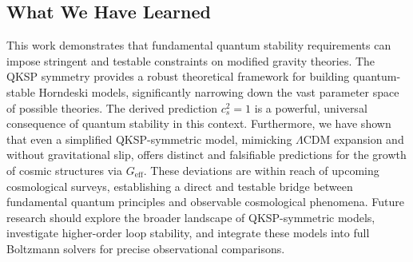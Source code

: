 \documentclass[twocolumn]{aastex631}
\begin{document}
\subsection{What We Have Learned}
This work demonstrates that fundamental quantum stability requirements can impose stringent and testable constraints on modified gravity theories. The QKSP symmetry provides a robust theoretical framework for building quantum-stable Horndeski models, significantly narrowing down the vast parameter space of possible theories. The derived prediction $c_s^2=1$ is a powerful, universal consequence of quantum stability in this context. Furthermore, we have shown that even a simplified QKSP-symmetric model, mimicking $\Lambda$CDM expansion and without gravitational slip, offers distinct and falsifiable predictions for the growth of cosmic structures via $G_{\text{eff}}$. These deviations are within reach of upcoming cosmological surveys, establishing a direct and testable bridge between fundamental quantum principles and observable cosmological phenomena. Future research should explore the broader landscape of QKSP-symmetric models, investigate higher-order loop stability, and integrate these models into full Boltzmann solvers for precise observational comparisons.

{}

\end{document}
